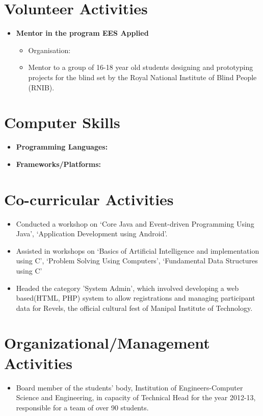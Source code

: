 \documentclass[10pt]{article}
\begin{document}
\section*{Volunteer Activities}
\begin{itemize}
	\item\bf{Mentor in the program EES Applied}
	\begin{itemize}
		\item[] Organisation: 
		\item[] Mentor to a group of 16-18 year old students designing and prototyping projects for the blind set by the Royal National Institute of Blind People (RNIB).
	\end{itemize}
\end{itemize}

\section*{Computer Skills}
\begin{itemize}
    \item \bf{Programming Languages}: 
    \item \bf{Frameworks/Platforms}: 
\end{itemize}

\section*{Co-curricular Activities}
\begin{itemize}
	\item[] Conducted a workshop on ‘Core Java and Event-driven Programming Using Java’, ‘Application Development using Android’.
	\item[] Assisted in workshops on ‘Basics of Artificial Intelligence and implementation using C’, ‘Problem Solving Using Computers’, ‘Fundamental Data Structures using C’
    \item[] Headed the category ’System Admin’, which involved developing a web based(HTML, PHP) system to allow registrations and managing participant data for Revels, the official cultural fest of Manipal Institute of Technology.
\end{itemize}

\section*{Organizational/Management Activities}
\begin{itemize}
	\item[] Board member of the students’ body, Institution of Engineers-Computer Science and Engineering, in capacity of Technical Head for the year 2012-13, responsible for a team of over 90 students.
\end{itemize}
\end{document}
